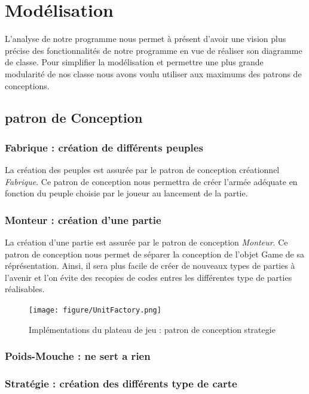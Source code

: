 \section{Modélisation}


	L'analyse de notre programme nous permet à présent d'avoir une vision plus précise des fonctionnalités de notre programme en vue de réaliser son diagramme de classe. Pour simplifier la modélisation et permettre une plus grande modularité de nos classe nous avons voulu utiliser aux maximums des patrons de conceptions. 

	\subsection{patron de Conception}
		\subsubsection{Fabrique : création de différents peuples}
		La création des peuples est assurée par le patron de conception créationnel \emph{Fabrique}. Ce patron de conception nous permettra de créer l'armée adéquate en fonction du peuple choisie par le joueur au lancement de la partie. 
		
		\subsubsection{Monteur : création d'une partie}
		La création d'une partie est assurée par le patron de conception \emph{Monteur}. Ce patron de conception nous permet de séparer la conception de l'objet Game de sa réprésentation. Ainsi, il sera plus facile de créer de nouveaux types de parties à l'avenir et l'on évite des recopies de codes entres les différentes type de parties réalisables.

		\begin{figure}[h]
		\begin{center}
			\texttt{[image: figure/UnitFactory.png]}
		\end{center}
		\caption{Implémentations du plateau de jeu : patron de conception strategie}
		\label{fig:strategy}
	\end{figure}

		\subsubsection{Poids-Mouche : ne sert a rien}

		\subsubsection{Stratégie : création des différents type de carte}



